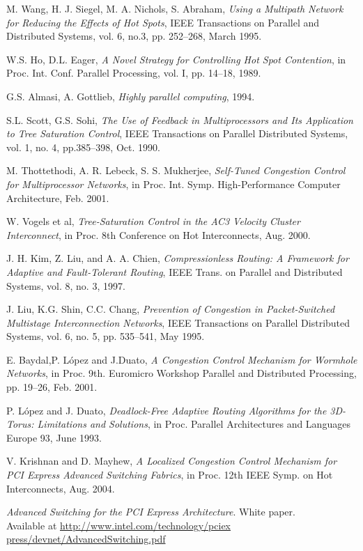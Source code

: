 \documentclass[12pt]{article}
\begin{document}
\begin{thebibliography}{99}
 M. Wang, H. J. Siegel, M. A. Nichols, S. Abraham, \emph{Using a Multipath Network for Reducing the Effects of Hot Spots}, IEEE Transactions on Parallel and Distributed Systems, vol. 6, no.3, pp. 252--268, March 1995.

 W.S. Ho, D.L. Eager, \emph{A Novel Strategy for Controlling Hot Spot Contention}, in Proc. Int. Conf. Parallel Processing, vol. I, pp. 14--18, 1989.

 G.S. Almasi, A. Gottlieb, \emph{Highly parallel computing}, 1994.

 S.L. Scott, G.S. Sohi, \emph{The Use of Feedback in Multiprocessors and Its Application to Tree Saturation Control}, IEEE Transactions on Parallel Distributed Systems, vol. 1, no. 4, pp.385--398, Oct. 1990.

 M. Thottethodi, A. R. Lebeck, S. S. Mukherjee, \emph{Self-Tuned Congestion Control for Multiprocessor Networks}, in Proc. Int. Symp. High-Performance Computer Architecture, Feb. 2001.

 W. Vogels et al, \emph{Tree-Saturation Control in the AC3 Velocity Cluster Interconnect}, in Proc. 8th Conference on Hot Interconnects, Aug. 2000.

 J. H. Kim, Z. Liu, and A. A. Chien, \emph{Compressionless Routing: A Framework for Adaptive and Fault-Tolerant Routing}, IEEE Trans. on Parallel and Distributed Systems, vol. 8, no. 3, 1997.

 J. Liu, K.G. Shin, C.C. Chang, \emph{Prevention of Congestion in Packet-Switched Multistage Interconnection Networks}, IEEE Transactions on Parallel Distributed Systems, vol. 6, no. 5, pp. 535--541, May 1995.

 E. Baydal,P. L\'opez and J.Duato, \emph{A Congestion Control Mechanism for Wormhole Networks}, in Proc. 9th. Euromicro Workshop Parallel and Distributed Processing, pp. 19--26, Feb. 2001.

 P. L\'opez and J. Duato, \emph{Deadlock-Free Adaptive Routing Algorithms for the 3D-Torus: Limitations and Solutions}, in Proc. Parallel Architectures and Languages Europe 93, June 1993.

 V. Krishnan and D. Mayhew, \emph{A Localized Congestion Control Mechanism for PCI Express Advanced Switching Fabrics}, in Proc. 12th IEEE Symp. on Hot Interconnects, Aug. 2004.

 \emph{Advanced Switching for the PCI Express Architecture}. White paper.\\
Available at \url{http://www.intel.com/technology/pciex press/devnet/AdvancedSwitching.pdf}

\end{thebibliography}
\end{document}
